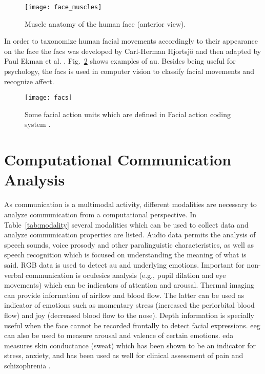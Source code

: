 \begin{figure}
    \centering
    \texttt{[image: face\_muscles]}
    \caption{Muscle anatomy of the human face (anterior view).\cite{Prendergast2013anatomy}}
    \label{fig:facemuscles}
\end{figure}

In order to taxonomize human facial movements accordingly to their appearance on the face the \gls{facs} was developed by Carl-Herman Hjortsj{\"{o}} and then adapted by Paul Ekman et al. \cite{Ekman1977}. Fig.~\ref{fig:facs} shows examples of \gls{au}. Besides being useful for psychology, the \gls{facs} is used in computer vision to classify facial movements and recognize affect.  


\begin{figure}
    \centering
    \texttt{[image: facs]}
    \caption{Some facial action units which are defined in Facial action coding system \cite{Ekman1977}.}
    \label{fig:facs}
\end{figure}


\section{Computational Communication Analysis }

As communication is a multimodal activity, different modalities are necessary to analyze communication from a computational perspective. In Table~\ref{tab:modality} several modalities which can be used to collect data and analyze communication properties are listed. Audio data permits the analysis of speech sounds, voice prosody and other paralinguistic characteristics, as well as speech recognition which is focused on understanding the meaning of what is said. RGB data is used to detect \gls{au} and underlying emotions. Important for non-verbal communication is oculesics analysis (e.g., pupil dilation and eye movements) which can be indicators of attention and arousal. Thermal imaging can provide information of airflow and blood flow. The latter can be used as indicator of emotions such as momentary stress (increased the periorbital blood flow) and joy (decreased blood flow to the nose)\cite{Corneanu2016survey}. Depth information is specially useful when the face cannot be recorded frontally to detect facial expressions. \gls{eeg} can also be used to measure arousal and valence of certain emotions. \gls{eda} measures skin conductance (sweat) which has been shown to be an indicator for stress, anxiety, and has been used as well for clinical assessment of pain and schizophrenia \cite{Chen2015wavelet}.


